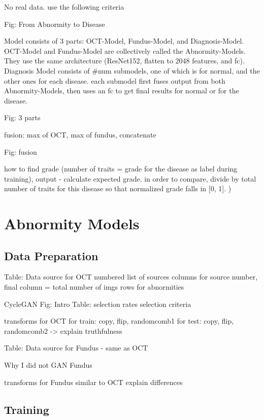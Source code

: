 \documentclass{article}
\begin{document}
		No real data. use the following criteria
		
		Fig: From Abnormity to Disease
		
		Model consists of 3 parts: OCT-Model, Fundus-Model, and Diagnosis-Model. OCT-Model and Fundus-Model are collectively called the Abnormity-Models. They use the same architecture (ResNet152, flatten to 2048 features, and fc). Diagnosis Model consists of #num submodels, one of which is for normal, and the other ones for each disease. each submodel first fuses output from both Abnormity-Models, then uses an fc to get final results for normal or for the disease. 
		
		Fig: 3 parts
		
		fusion: max of OCT, max of fundus, concatenate
		
		Fig: fusion
		
		how to find grade (number of traits = grade for the disease as label during training), output - calculate expected grade. in order to compare, divide by total number of traits for this disease so that normalized grade falls in [0, 1]. )
		
	\section{Abnormity Models}
	
		\subsection{Data Preparation}
		
			Table: Data source for OCT
				numbered list of sources
				columns for source number, final column = total number of imgs
				rows for abnormities
			
			CycleGAN
				Fig: Intro
				Table: selection rates
				selection criteria
				
			transforms for OCT
				for train: copy, flip, randomcomb1
				for test: copy, flip, randomcomb2 -> explain truthfulness
				
				
				
			Table: Data source for Fundus - same as OCT
				
			Why I did not GAN Fundus
			
			transforms for Fundus
				similar to OCT
				explain differences
			
		\subsection{Training}
			
\end{document}
